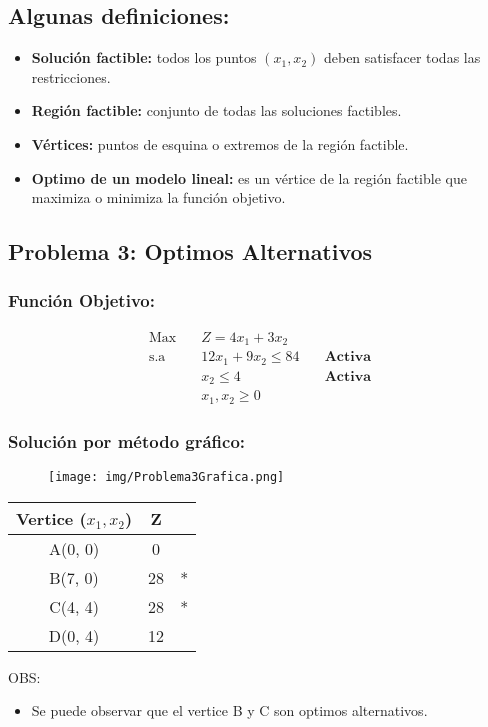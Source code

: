 \documentclass{templateNote}
\begin{document}
\subsection{Algunas definiciones:}
\begin{itemize}
    \item \textbf{Solución factible:} todos los puntos $(x_1, x_2)$ deben satisfacer todas las restricciones.
    \item \textbf{Región factible:} conjunto de todas las soluciones factibles.
    \item \textbf{Vértices:} puntos de esquina o extremos de la región factible.
    \item \textbf{Optimo de un modelo lineal:} es un vértice de la región factible que maximiza o minimiza la función objetivo.
\end{itemize}

\newpage
\subsection*{Problema 3: Optimos Alternativos}
\subsubsection*{Función Objetivo:}
\begin{equation*}
    \begin{aligned}
        \text{Max} \quad & Z = 4x_1 + 3x_2 \\
        \text{s.a} \quad & 12x_1 + 9x_2 \leq 84 \quad &\textbf{Activa} \\
        & x_2 \leq 4 \quad &\textbf{Activa} \\
        & x_1, x_2 \geq 0
    \end{aligned}
\end{equation*}

\subsubsection*{Solución por método gráfico:}
\begin{figure}[H]
    \centering
    \texttt{[image: img/Problema3Grafica.png]}
\end{figure}
\begin{center}
    \begin{tabular}{|c|c|c|}
        \hline
        \textbf{Vertice ($x_1,x_2$)} & Z &  \\ \hline
        A(0, 0) & 0 & \\ \hline
        B(7, 0) & 28 & * \\ \hline
        C(4, 4) & 28 & * \\ \hline
        D(0, 4) & 12 & \\ \hline
    \end{tabular}
\end{center}
OBS:
\begin{itemize}
    \item Se puede observar que el vertice B y C son optimos alternativos.
\end{itemize}
\end{document}
